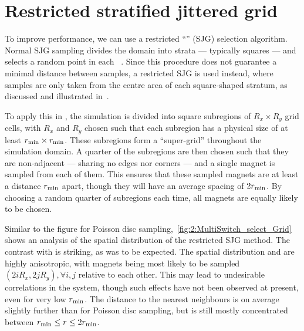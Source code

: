 \section{Restricted stratified jittered grid}
To improve performance, we can use a restricted ``'' (SJG) selection algorithm.
Normal SJG sampling divides the domain into strata --- typically squares --- and selects a random point in each ~\cite{ProgressiveMultiJittered}.
Since this procedure does not guarantee a minimal distance between samples, a restricted SJG is used instead, where samples are only taken from the centre area of each square-shaped stratum, as discussed and illustrated in~. \par %
To apply this in \hotspice, the simulation is divided into square subregions of $R_x \times R_y$ grid cells, with $R_x$ and $R_y$ chosen such that each subregion has a physical size of at least $r_\mathrm{min} \times r_\mathrm{min}$.
These subregions form a ``super-grid'' throughout the simulation domain.
A quarter of the subregions are then chosen such that they are non-adjacent --- sharing no edges nor corners --- and a single magnet is sampled from each of them. %
This ensures that these sampled magnets are at least a distance $r_\mathrm{min}$ apart, though they will have an average spacing of $2r_\mathrm{min}$.
By choosing a random quarter of subregions each time, all magnets are equally likely to be chosen. \\\par

Similar to the figure for Poisson disc sampling,~\cref{fig:2:MultiSwitch_select_Grid} shows an analysis of the spatial distribution of the restricted SJG method.
The contrast with  is striking, as was to be expected.
The spatial distribution and  are highly anisotropic, with magnets being most likely to be sampled $(2iR_x, 2jR_y), \forall i,j$ relative to each other.
This may lead to undesirable correlations in the system, though such effects have not been observed at present, even for very low $r_\mathrm{min}$.
The distance to the nearest neighbours is on average slightly further than for Poisson disc sampling, but is still mostly concentrated between $r_\mathrm{min} \leq r \leq 2r_\mathrm{min}$.

